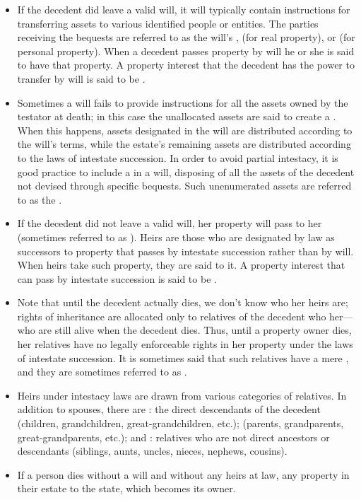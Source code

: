 \begin{itemize}
\item If the decedent did leave a valid will, it will typically contain
instructions for transferring assets to various identified people or entities.
The parties receiving the bequests are referred to as the will's
,  (for real property),
or  (for personal property). When a decedent passes property
by will he or she is said to have  that property. A property
interest that the decedent has the power to transfer by will is said to be
. 

\item Sometimes a will fails to provide instructions for all the assets owned by
the testator at death; in this case the unallocated assets are said to create a
. When this happens, assets designated in the will
are distributed according to the will's terms, while the estate's remaining
assets are distributed according to the laws of intestate succession. In order
to avoid partial intestacy, it is good practice to include a  in a will, disposing of all the assets of the decedent not devised
through specific bequests. Such unenumerated assets are referred to as the
.

\item If the decedent did not leave a valid will, her property will pass to her
 (sometimes referred to as ). Heirs are
those who are designated by law as successors to property that passes by
intestate succession rather than by will. When heirs take such property, they
are said to  it. A property interest that can pass by intestate
succession is said to be .

\item Note that until the decedent actually dies, we don't know who her heirs
are; rights of inheritance are allocated only to relatives of the decedent who
 her---who are still alive when the decedent dies. Thus, until
a property owner dies, her relatives have no legally enforceable rights in her
property under the laws of intestate succession. It is sometimes said that such
relatives have a mere , and they are sometimes referred to
as .

\item Heirs under intestacy laws are drawn from various categories of relatives.
In addition to spouses, there are : the direct descendants of the
decedent (children, grandchildren, great-grandchildren, etc.);
 (parents, grandparents, great-grandparents, etc.); and
: relatives who are not direct ancestors or descendants
(siblings, aunts, uncles, nieces, nephews, cousins).

\item If a person dies without a will and without any heirs at law, any property
in their estate  to the state, which becomes its owner.
\end{itemize}

